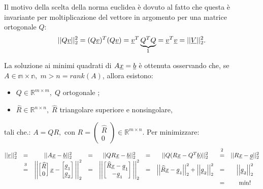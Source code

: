 \noindent Il motivo della scelta della norma euclidea è dovuto al fatto che questa è invariante per moltiplicazione del vettore in argomento per una matrice ortogonale $Q$:
\begin{equation*}
    ||Q\uline v||_2^2=(Q\uline v)^T(Q\uline v)=\uline v^T \underbrace{Q^TQ}_{\footnotemark}=\uline v^T\uline v=||\uline V||_2^2.
\end{equation*}
La soluzione ai minimi quadrati di $A\uline x=\uline b$ è ottenuta osservando che, se $A\in\mathbb{m\times n},\; m>n=rank(A)$, allora esistono:
\begin{itemize}
    \item $Q\in\mathbb R^{m\times m},\; Q$ ortogonale ;
    \item $\widehat{R}\in\mathbb R^{n\times n},\;\widehat{R}$ triangolare superiore e nonsingolare,
\end{itemize}
tali che.: $A=QR,$ con $R=\begin{pmatrix}
    \widehat{R}\\
    0
\end{pmatrix}\in\mathbb R^{m\times n}.$ Per minimizzare:
\begin{equation*}
    \begin{matrix}
        ||\uline r||_2^2&=&||A\uline x-\uline b||_2^2&=&||QR\uline x-\uline b||_2^2 &=& ||Q(R\uline x - Q^T\uline b)||_2^2&\overset{\footnotemark}{=}&||R\uline x-\uline g||_2^2\\
        &\overset{\footnotemark}{=}&
        \Biggl|\Biggl|\begin{bmatrix}
            \widehat{R}\\
            0
        \end{bmatrix}\uline x
        - \begin{bmatrix}
            \uline g_1\\
            \uline g_2
        \end{bmatrix}\Biggl|\Biggl|_2^2&=&\Biggl|\Biggl|\begin{bmatrix}
            \widehat{R}\uline x -\uline g_1\\
            -\uline g_1
        \end{bmatrix}\Biggl|\Biggl|_2^2 &=& \left|\left|\widehat{R}\uline x - \uline g_1\right|\right|_2^2 + \left|\left|\uline g_2\right|\right|_2^2 &=& \left|\left|\uline g_2\right|\right|_2^2\\
        &&&&&&&=& \min!
    \end{matrix}
\end{equation*}

